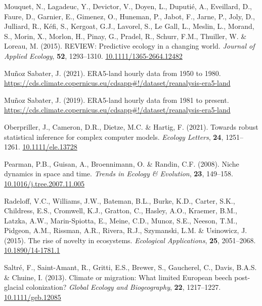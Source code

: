 \documentclass[11pt,]{article}
\newlength{\cslhangindent}
\newenvironment{CSLReferences}[2] %
 {%
  \setlength{\parindent}{0pt}
  \ifodd #1 \everypar{\setlength{\hangindent}{\cslhangindent}}\ignorespaces\fi
  \ifnum #2 > 0
  \setlength{\parskip}{#2\baselineskip}
  \fi
 }%
 {}
\begin{document}
\begin{CSLReferences}{1}{0}
\leavevmode{}%
Mouquet, N., Lagadeuc, Y., Devictor, V., Doyen, L., Duputié, A.,
Eveillard, D., Faure, D., Garnier, E., Gimenez, O., Huneman, P., Jabot,
F., Jarne, P., Joly, D., Julliard, R., Kéfi, S., Kergoat, G.J., Lavorel,
S., Le Gall, L., Meslin, L., Morand, S., Morin, X., Morlon, H., Pinay,
G., Pradel, R., Schurr, F.M., Thuiller, W. \& Loreau, M. (2015).
{REVIEW}: {Predictive} ecology in a changing world. \emph{Journal of
Applied Ecology}, \textbf{52}, 1293--1310.
\href{https://doi.org/10.1111/1365-2664.12482}{10.1111/1365-2664.12482}

\leavevmode{}%
Muñoz Sabater, J. (2021). ERA5-land hourly data from 1950 to 1980.
\url{https://cds.climate.copernicus.eu/cdsapp\#!/dataset/reanalysis-era5-land}

\leavevmode{}%
Muñoz Sabater, J. (2019). ERA5-land hourly data from 1981 to present.
\url{https://cds.climate.copernicus.eu/cdsapp\#!/dataset/reanalysis-era5-land}

\leavevmode{}%
Oberpriller, J., Cameron, D.R., Dietze, M.C. \& Hartig, F. (2021).
Towards robust statistical inference for complex computer models.
\emph{Ecology Letters}, \textbf{24}, 1251--1261.
\href{https://doi.org/10.1111/ele.13728}{10.1111/ele.13728}

\leavevmode{}%
Pearman, P.B., Guisan, A., Broennimann, O. \& Randin, C.F. (2008). Niche
dynamics in space and time. \emph{Trends in Ecology \& Evolution},
\textbf{23}, 149--158.
\href{https://doi.org/10.1016/j.tree.2007.11.005}{10.1016/j.tree.2007.11.005}

\leavevmode{}%
Radeloff, V.C., Williams, J.W., Bateman, B.L., Burke, K.D., Carter,
S.K., Childress, E.S., Cromwell, K.J., Gratton, C., Hasley, A.O.,
Kraemer, B.M., Latzka, A.W., Marin-Spiotta, E., Meine, C.D., Munoz,
S.E., Neeson, T.M., Pidgeon, A.M., Rissman, A.R., Rivera, R.J.,
Szymanski, L.M. \& Usinowicz, J. (2015). The rise of novelty in
ecosystems. \emph{Ecological Applications}, \textbf{25}, 2051--2068.
\href{https://doi.org/10.1890/14-1781.1}{10.1890/14-1781.1}

\leavevmode{}%
Saltré, F., Saint-Amant, R., Gritti, E.S., Brewer, S., Gaucherel, C.,
Davis, B.A.S. \& Chuine, I. (2013). Climate or migration: What limited
{European} beech post-glacial colonization? \emph{Global Ecology and
Biogeography}, \textbf{22}, 1217--1227.
\href{https://doi.org/10.1111/geb.12085}{10.1111/geb.12085}


\end{CSLReferences}
\end{document}
